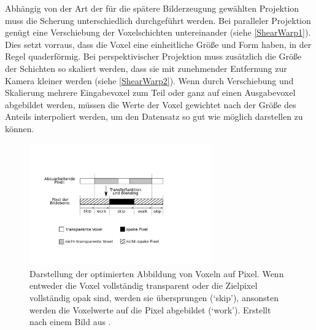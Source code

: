 \documentclass[a4paper,fontsize=12pt,toc=bib,halfparskip,ngerman]{scrartcl}
\begin{document}
Abh\"angig von der Art der f\"ur die sp\"atere Bilderzeugung gew\"ahlten Projektion muss die Scherung unterschiedlich durchgef\"uhrt werden. Bei paralleler Projektion gen\"ugt eine Verschiebung der Voxelschichten untereinander (siehe \cref{ShearWarp1}). Dies setzt vorraus, dass die Voxel eine einheitliche Gr\"o{\ss}e und Form haben, in der Regel quaderf\"ormig. Bei perspektivischer Projektion muss zus\"atzlich die Gr\"o{\ss}e der Schichten so skaliert werden, dass sie mit zunehmender Entfernung zur Kamera kleiner werden (siehe \cref{ShearWarp2}). Wenn durch Verschiebung und Skalierung mehrere Eingabevoxel zum Teil oder ganz auf einen Ausgabevoxel abgebildet werden, m\"ussen die Werte der Voxel gewichtet nach der Gr\"o{\ss}e des Anteils interpoliert werden, um den Datensatz so gut wie m\"oglich darstellen zu k\"onnen.

\begin{figure}
	\centering
	\includegraphics[width=0.7\textwidth]{pictures/Scanline.png}
	\caption{Darstellung der optimierten Abbildung von Voxeln auf Pixel. Wenn entweder die Voxel vollst\"andig transparent oder die Zielpixel vollst\"andig opak sind, werden sie \"ubersprungen (`skip'), ansonsten werden die Voxelwerte auf die Pixel abgebildet (`work'). Erstellt nach einem Bild aus \cite{lacroute1994fast}.}
	\label{Scanline}
\end{figure}
\end{document}
